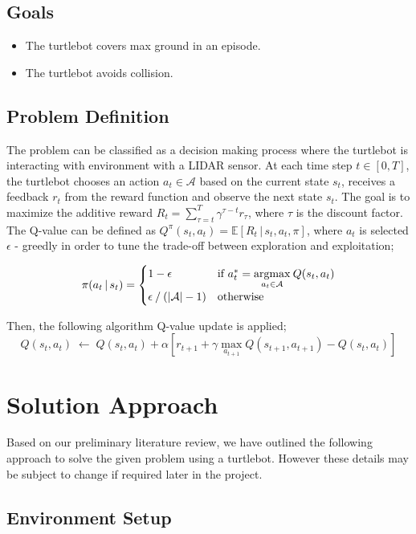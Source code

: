\documentclass{article}
\newcommand{\argmax}{\operatornamewithlimits{argmax}}
\begin{document}
\subsection{Goals}
\begin{itemize}
\item The turtlebot covers max ground in an episode.
\item The turtlebot avoids collision.
\end{itemize}
\subsection{Problem Definition}
The problem can be classified as a decision making process where the turtlebot is interacting with environment with a LIDAR sensor. At each time step $t \in [0, T]$, the turtlebot chooses an action $a_t \in \mathcal{A}$ based on the current state $s_t$, receives a feedback $r_t$ from the reward function and observe the next state $s_t$. The goal is to maximize the additive reward $R_t = \sum_{\tau=t}^{T}\gamma^{\tau-t}r_{\tau}$, where $\tau$ is the discount factor. The Q-value can be defined as $ Q^{\pi}(s_t, a_t)= \mathbb{E}[R_t\,\vert\,s_t,a_t,\pi]$, where $a_t$ is selected $\epsilon$ - greedly in order to tune the trade-off between exploration and exploitation;

\begin{equation*}
  \pi(a_t\,\vert\,s_t) =
  \begin{cases}
    1 - \epsilon & \text{if }  a_t^* = \underset{a_t \in  \mathcal{A}}{\argmax}\: Q(s_t, a_t) \\
    \epsilon \mathbin{/} (\abs{\mathcal{A}}-1) & \text{otherwise}
  \end{cases}
\end{equation*}

Then, the following algorithm Q-value update is applied;
\[
Q(s_t,a_t)\;\leftarrow\;Q(s_t,a_t) + \alpha [ r_{t+1} + \gamma \max_{a_{t+1}}
Q(s_{t+1},a_{t+1}) - Q(s_t,a_t) ]
\]



\section{Solution Approach}
Based on our preliminary literature review, we have outlined the following approach to solve the given problem using a turtlebot. However these details may be subject to change if required later in the project.

\subsection{Environment Setup}
\end{document}
